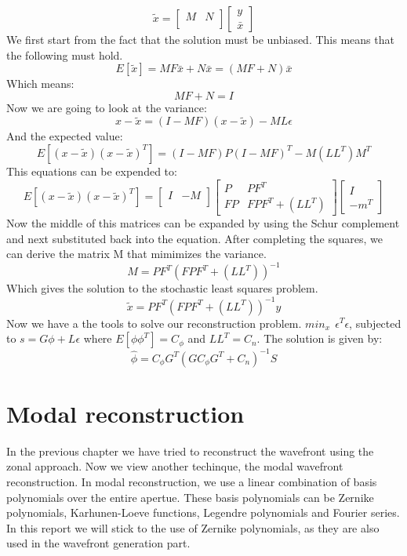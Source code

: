 \documentclass{article}
\begin{document}
$$ \tilde{x} = 
\begin{bmatrix}
M & N \\
\end{bmatrix}
\begin{bmatrix}
y \\
\bar{x}
\end{bmatrix}
$$
We first start from the fact that the solution must be unbiased. This means that the following must hold.
$$ E[\tilde{x}]=MF\bar{x} + N\bar{x}=(MF+N)\bar{x}$$
Which means:
$$MF+N=I$$  
Now we are going to look at the variance:
$$x-\tilde{x}=(I-MF)(x-\tilde{x})-ML\epsilon$$
And the expected value:
$$ E[(x-\tilde{x})(x-\tilde{x})^T] = (I-MF)P(I-MF)^T - M(LL^T)M^T$$
This equations can be expended to:
$$ E[(x-\tilde{x})(x-\tilde{x})^T] =
\begin{bmatrix}
I & -M \\
\end{bmatrix}
\begin{bmatrix}
P  & PF^T \\
FP & FPF^T+(LL^T)
\end{bmatrix}
\begin{bmatrix}
I  \\
-m^T
\end{bmatrix}
$$ 
Now the middle of this matrices can be expanded by using the Schur complement and next substituted back into the equation. After completing the squares, we can derive the matrix M that mimimizes the variance.
$$ M = PF^T(FPF^T+(LL^T))^{-1}$$
Which gives the solution to the stochastic least squares problem.
$$\tilde{x} = PF^T(FPF^T+(LL^T))^{-1}y$$
Now we have a the tools to solve our reconstruction problem.
\newline
\newline
$ min_x \ \ \epsilon^T \epsilon $, subjected to $ s=G\phi + L\epsilon$
\newline
\newline
where $E[\phi\phi^T]=C_\phi$ and $LL^T=C_n$. The solution is given by:
$$\hat{\phi} = C_\phi G^T(GC_\phi G^T + C_n)^{-1}S $$

\newpage
\section{Modal reconstruction}
In the previous chapter we have tried to reconstruct the wavefront using the zonal approach. Now we view another techinque, the modal wavefront reconstruction. In modal reconstruction, we use a linear combination of basis polynomials over the entire apertue. These basis polynomials can be Zernike polynomials, Karhunen-Loeve functions, Legendre polynomials and Fourier series. In this report we will stick to the use of Zernike polynomials, as they are also used in the wavefront generation part. 
\end{document}
